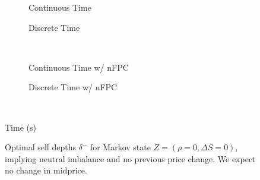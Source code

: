 \begin{figure}
\centering
\begin{subfigure}{.45\linewidth}
  \centering
  \setlength\figureheight{\linewidth} 
  \setlength\figurewidth{\linewidth}
  
  \caption{Continuous Time}
\end{subfigure}%
\hfill%
\begin{subfigure}{.45\linewidth}
  \centering
  \setlength\figureheight{\linewidth} 
  \setlength\figurewidth{\linewidth}
   
  \caption{Discrete Time}
\end{subfigure}\\
\vspace{1cm}
\begin{subfigure}{.45\linewidth}
  \centering
  \setlength\figureheight{\linewidth} 
  \setlength\figurewidth{\linewidth}
   
  \caption{Continuous Time w/ nFPC}
\end{subfigure}%
\hfill%
\begin{subfigure}{.45\linewidth}
  \centering
  \setlength\figureheight{\linewidth} 
  \setlength\figurewidth{\linewidth}
   
  \caption{Discrete Time w/ nFPC}
\end{subfigure}\\

\leavevmode{}\hspace{0pt plus 1filll}\null

Time (s)

\vspace{1cm}
\begin{subfigure}{\linewidth}
  \centering
   
\end{subfigure}%
  \caption{Optimal sell depths $\delta^-$ for Markov state $Z=(\rho = 0, \Delta S = 0)$, implying neutral imbalance and no previous price change. We expect no change in midprice.}
  \label{fig:comp_dm_z8}
\end{figure}

